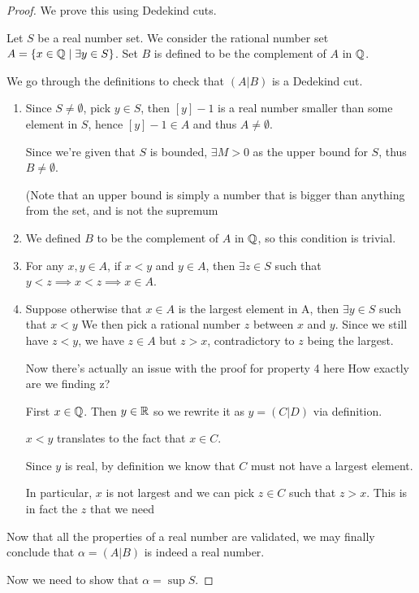 \begin{proof}
We prove this using Dedekind cuts.

Let $S$ be a real number set. 
We consider the rational number set $A = \{x \in \mathbb Q \mid \exists y \in S\}$. Set $B$ is defined to be the complement of $A$ in $\mathbb Q$.

We go through the definitions to check that $(A|B)$ is a Dedekind cut.
\begin{enumerate}
\item Since $S \neq \emptyset$, pick $y \in S$, then $[y]-1$ is a real number smaller than some element in $S$, hence $[y]-1 \in A$ and thus $A \neq \emptyset$.

Since we're given that $S$ is bounded, $\exists M>0$ as the upper bound for $S$, thus $B \neq \emptyset$.

(Note that an upper bound is simply a number that is bigger than anything from the set, and is not the supremum

\item We defined $B$ to be the complement of $A$ in $\mathbb Q$, so this condition is trivial.

\item For any $x,y \in A$, if $x<y$ and $y\in A$, then $\exists z \in S$ such that $y<z \implies x<z \implies x \in A$.

\item Suppose otherwise that $x \in A$ is the largest element in A, then $\exists y \in S$ such that $x<y$
We then pick a rational number $z$ between $x$ and $y$. 
Since we still have $z<y$, we have $z \in A$ but $z>x$, contradictory to $z$ being the largest.

Now there's actually an issue with the proof for property 4 here
How exactly are we finding z?

First $x \in \mathbb Q$. 
Then $y \in \mathbb R$ so we rewrite it as $y=(C|D)$ via definition.

$x<y$ translates to the fact that $x \in C$.

Since $y$ is real, by definition we know that $C$ must not have a largest element.

In particular, $x$ is not largest and we can pick $z \in C$ such that $z>x$. 
This is in fact the $z$ that we need
\end{enumerate}

Now that all the properties of a real number are validated, we may finally conclude that $\alpha=(A|B)$ is indeed a real number.

Now we need to show that $\alpha = \sup S$.


\end{proof}
